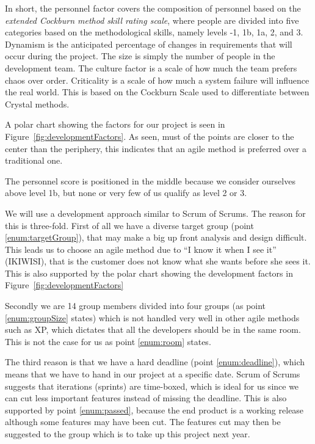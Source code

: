 In short, the personnel factor covers the composition of personnel based on the \textit{extended Cockburn method skill rating scale}, where people are divided into five categories based on the methodological skills, namely levels -1, 1b, 1a, 2, and 3.
Dynamism is the anticipated percentage of changes in requirements that will occur during the project.
The size is simply the number of people in the development team.
The culture factor is a scale of how much the team prefers chaos over order.
Criticality is a scale of how much a system failure will influence the real world.
This is based on the Cockburn Scale used to differentiate between Crystal methods.

A polar chart showing the factors for our project is seen in Figure~\ref{fig:developmentFactors}.
As seen, must of the points are closer to the center than the periphery, this indicates that an agile method is preferred over a traditional one.

The personnel score is positioned in the middle because we consider ourselves above level 1b, but none or very few of us qualify as level 2 or 3.


We will use a development approach similar to Scrum of Scrums.
The reason for this is three-fold.
First of all we have a diverse target group (point \ref{enum:targetGroup}), that may make a big up front analysis and design difficult.
This leads us to choose an agile method due to ``I know it when I see it'' (IKIWISI), that is the customer does not know what she wants before she sees it.
This is also supported by the polar chart showing the development factors in Figure~\ref{fig:developmentFactors}

Secondly we are 14 group members divided into four groups (as point \ref{enum:groupSize} states) which is not handled very well in other agile methods such as XP, which dictates that all the developers should be in the same room. 
This is not the case for us as point \ref{enum:room} states.

The third reason is that we have a hard deadline (point \ref{enum:deadline}), which means that we have to hand in our project at a specific date.
Scrum of Scrums suggests that iterations (sprints) are time-boxed, which is ideal for us since we can cut less important features instead of missing the deadline.
This is also supported by point \ref{enum:passed}, because the end product is a working release although some features may have been cut.
The features cut may then be suggested to the group which is to take up this project next year.


